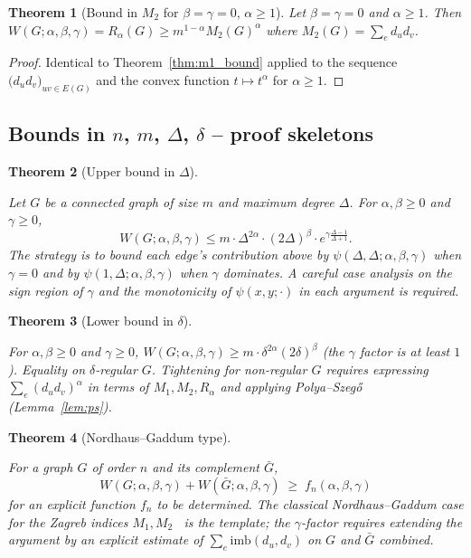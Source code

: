 \documentclass[11pt,a4paper]{article}
\newtheorem{theorem}{Theorem}[section]
\theoremstyle{definition}
\newcommand{\Wuzi}{W(G;\alpha,\beta,\gamma)}
\newcommand{\todo}[1]{}
\begin{document}
\begin{theorem}[Bound in $M_2$ for $\beta=\gamma=0$, $\alpha\ge 1$]
\label{thm:m2_alpha}
Let $\beta=\gamma=0$ and $\alpha\ge 1$. Then
$\Wuzi=R_\alpha(G)\ge m^{1-\alpha}M_2(G)^\alpha$ where
$M_2(G)=\sum_e d_u d_v$.
\end{theorem}

\begin{proof}
Identical to Theorem~\ref{thm:m1_bound} applied to the sequence
$\bigl(d_u d_v\bigr)_{uv\in E(G)}$ and the convex function
$t\mapsto t^\alpha$ for $\alpha\ge 1$.
\end{proof}

\subsection{Bounds in $n$, $m$, $\Delta$, $\delta$ -- proof skeletons}

\begin{theorem}[Upper bound in $\Delta$]\label{thm:upper_Delta}
\todo{PROOF SKETCH -- TO BE COMPLETED}
Let $G$ be a connected graph of size $m$ and maximum degree
$\Delta$. For $\alpha,\beta\ge 0$ and $\gamma\ge 0$,
\[
\Wuzi\le m\cdot \Delta^{2\alpha}\cdot (2\Delta)^{\beta}
\cdot e^{\gamma\frac{\Delta-1}{\Delta+1}}.
\]
The strategy is to bound each edge's contribution above by
$\psi(\Delta,\Delta;\alpha,\beta,\gamma)$ when $\gamma=0$
and by $\psi(1,\Delta;\alpha,\beta,\gamma)$ when $\gamma$ dominates.
A careful case analysis on the sign region of $\gamma$ and the
monotonicity of $\psi(x,y;\cdot)$ in each argument is required.
\end{theorem}

\begin{theorem}[Lower bound in $\delta$]\label{thm:lower_delta}
\todo{PROOF SKETCH -- TO BE COMPLETED}
For $\alpha,\beta\ge 0$ and $\gamma\ge 0$,
$\Wuzi\ge m\cdot \delta^{2\alpha}(2\delta)^{\beta}$
(the $\gamma$ factor is at least $1$). Equality on $\delta$-regular
$G$. Tightening for non-regular $G$ requires expressing
$\sum_e (d_u d_v)^\alpha$ in terms of $M_1, M_2, R_\alpha$ and
applying Polya--Szeg\H{o} (Lemma~\ref{lem:ps}).
\end{theorem}

\begin{theorem}[Nordhaus--Gaddum type]\label{thm:NG}
\todo{PROOF SKETCH -- TO BE COMPLETED}
For a graph $G$ of order $n$ and its complement $\bar G$,
\[
W(G;\alpha,\beta,\gamma)+W(\bar G;\alpha,\beta,\gamma)
\;\ge\; f_{n}(\alpha,\beta,\gamma)
\]
for an explicit function $f_n$ to be determined. The classical
Nordhaus--Gaddum case for the Zagreb indices $M_1, M_2$
\cite{NordhausGaddumOrig1956}~is the template; the
$\gamma$-factor requires extending the argument by an explicit
estimate of $\sum_e\mathrm{imb}(d_u,d_v)$ on $G$ and $\bar G$
combined.
\end{theorem}
\end{document}
